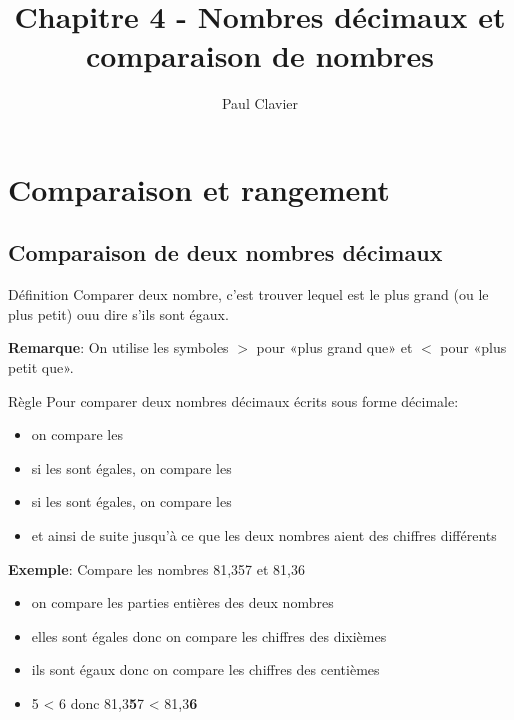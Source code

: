 \documentclass[12pt,a4paper]{article}
\author{Paul Clavier}
\title{Chapitre 4 - Nombres décimaux et comparaison de nombres}
\begin{document}
\renewcommand\thesection{\Roman{section}}
\renewcommand\thesubsection{\arabic{subsection}}


\ifdefined\isprof
	\TeacherModeOn
\fi




\begin{center}
\end{center}

\section{Comparaison et rangement}

\subsection{Comparaison de deux nombres décimaux}

\begin{definition}{Définition}
Comparer deux nombre, c'est trouver lequel est le plus grand (ou le plus petit) ouu dire s'ils sont égaux.
\end{definition}

\textbf{Remarque}: On utilise les symboles $>$ pour «plus grand que» et $<$ pour «plus petit que». 

\begin{definition}{Règle}
Pour comparer deux nombres décimaux écrits sous forme décimale:
\begin{itemize}
\item on compare les 
\item si les  sont égales, on compare les 
\item si les  sont égales, on compare les 
\item et ainsi de suite jusqu'à ce que les deux nombres aient des chiffres différents
\end{itemize}
\end{definition}

\textbf{Exemple}: Compare les nombres 81,357 et 81,36
\begin{itemize}
\item on compare les parties entières des deux nombres
\item elles sont égales donc on compare les chiffres des dixièmes
\item ils sont égaux donc on compare les chiffres des centièmes
\item 5 < 6 donc 81,3\textbf{5}7 < 81,3\textbf{6}
\end{itemize} 
\end{document}
